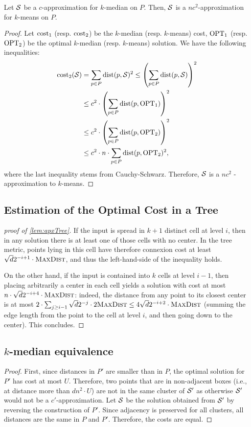 \begin{lemma}
Let $\mathcal S$ be a $c$-approximation for $k$-median on $P$. Then, $\mathcal S$ is a $nc^2$-approximation for $k$-means on $P$.
\end{lemma}
\begin{proof}
Let $\operatorname{cost}_1$ (resp. $\operatorname{cost}_2$) be the $k$-median (resp. $k$-means) cost, $\text{OPT}_1$ (resp. $\text{OPT}_2$) be the optimal $k$-median (resp. $k$-means) solution. We have the following inequalities:
\begin{align*}
\operatorname{cost}_2(\mathcal S) &= \sum_{p\in P} \operatorname{dist}(p, \mathcal S)^2 \leq \left( \sum_{p\in P} \operatorname{dist}(p, \mathcal S)\right)^2\\
&\leq c^2 \cdot \left(  \sum_{p\in P} \operatorname{dist}(p, \text{OPT}_1)\right)^2\\
&\leq c^2 \cdot \left(  \sum_{p\in P} \operatorname{dist}(p, \text{OPT}_2)\right)^2\\
&\leq c^2 \cdot n \cdot  \sum_{p\in P} \operatorname{dist}(p, \text{OPT}_2)^2,
\end{align*}
where the last inequality stems from Cauchy-Schwarz. Therefore, $\mathcal S$ is a $nc^2$ - approximation to $k$-means. 
\end{proof}

\subsection{Estimation of the Optimal Cost in a Tree}
\label{app:apx-tree-proof}

\begin{proof}[proof of \cref{lem:apxTree}]
If the input is spread in $k+1$ distinct cell at level $i$, then in any solution there is at least one of those cells with no center. In the tree metric, points lying in this cell have therefore connexion cost at least $\sqrt{d}2^{-i+1} \cdot \textsc{MaxDist}$, and thus the left-hand-side of the inequality holds.

On the other hand, if the input is contained into $k$ cells at level $i-1$, then placing arbitrarily a center in each cell yields a solution with cost at most $n \cdot \sqrt{d}2^{-i+4} \cdot \textsc{MaxDist}$: indeed, the distance from any point to its closest center is at most $2 \cdot \sum_{j \geq i-1} \sqrt{d}2^{-j} \cdot 2\textsc{MaxDist} \leq 4 \sqrt{d}2^{-i+2} \cdot \textsc{MaxDist}$ (summing the edge length from the point to the cell at level $i$, and then going down to the center). This concludes.
\end{proof}

\subsection{$k$-median equivalence}
\label{app:kmedian}
\begin{proof}
First, since distances in $P'$ are smaller than in $P$, the optimal solution for $P'$ has cost at most $U$. Therefore, two points that are in non-adjacent boxes
(i.e., at distance more than $d n^2\cdot U$) are not in the same cluster of $\mathcal S'$ as otherwise $\mathcal S'$ would not be a $c'$-approximation.  Let $\mathcal S$ be
the solution obtained from $\mathcal S'$ by reversing the construction of $P'$. Since adjacency is preserved for all clusters, all
distances are the same in $P$ and $P'$. Therefore, the costs are equal.
\end{proof}

